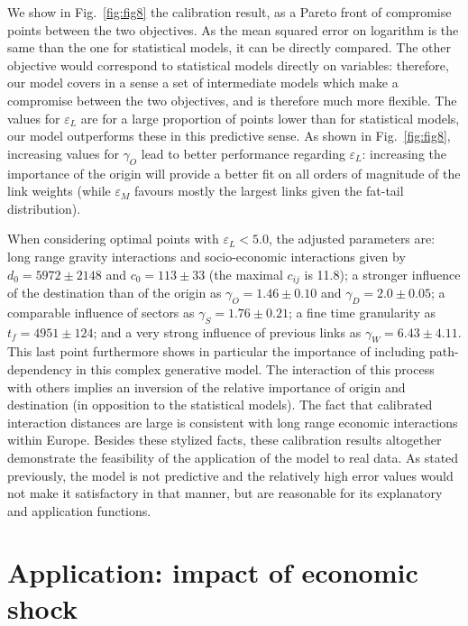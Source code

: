 \documentclass[10pt,letterpaper]{article}
\begin{document}
We show in Fig.~\ref{fig:fig8} the calibration result, as a Pareto front of compromise points between the two objectives. As the mean squared error on logarithm is the same than the one for statistical models, it can be directly compared. The other objective would correspond to statistical models directly on variables: therefore, our model covers in a sense a set of intermediate models which make a compromise between the two objectives, and is therefore much more flexible. The values for $\varepsilon_L$ are for a large proportion of points lower than for statistical models, our model outperforms these in this predictive sense. As shown in Fig.~\ref{fig:fig8}, increasing values for $\gamma_O$ lead to better performance regarding $\varepsilon_L$: increasing the importance of the origin will provide a better fit on all orders of magnitude of the link weights (while $\varepsilon_M$ favours mostly the largest links given the fat-tail distribution).

When considering optimal points with $\varepsilon_L < 5.0$, the adjusted parameters are: long range gravity interactions and socio-economic interactions given by $d_0 = 5972 \pm 2148$ and $c_0 = 113 \pm 33$ (the maximal $c_{ij}$ is 11.8); a stronger influence of the destination than of the origin as $\gamma_O = 1.46 \pm 0.10$ and $\gamma_D = 2.0 \pm 0.05$; a comparable influence of sectors as $\gamma_S = 1.76 \pm 0.21$; a fine time granularity as $t_f = 4951 \pm 124$; and a very strong influence of previous links as $\gamma_W = 6.43 \pm 4.11$. This last point furthermore shows in particular the importance of including path-dependency in this complex generative model. The interaction of this process with others implies an inversion of the relative importance of origin and destination (in opposition to the statistical models). The fact that calibrated interaction distances are large is consistent with long range economic interactions within Europe. Besides these stylized facts, these calibration results altogether demonstrate the feasibility of the application of the model to real data. As stated previously, the model is not predictive and the relatively high error values would not make it satisfactory in that manner, but are reasonable for its explanatory and application functions.


\section*{Application: impact of economic shock}
\end{document}

